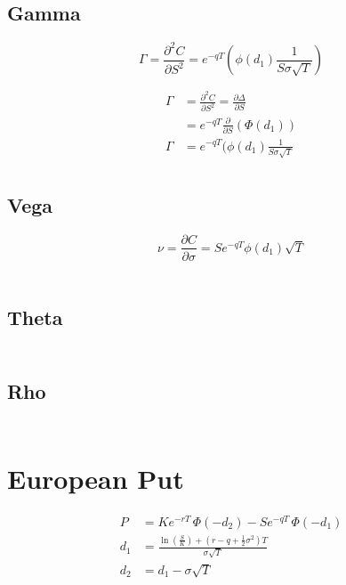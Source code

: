 \documentclass[12pt,a4paper]{article}
\begin{document}
\subsection{Gamma}

\[
  \boxed{\Gamma = \frac{\partial^2 C}{\partial S^2} = e^{-qT}(\phi(d_1)\frac{1}{S\sigma\sqrt{T}}) }
\]

\[
  \begin{aligned}
    \Gamma & = \frac{\partial^2 C}{\partial S^2} = \frac{\partial \Delta}{\partial S} \\
           & = e^{-qT}\frac{\partial}{\partial S}(\Phi(d_1)) \\
    \Gamma & = e^{-qT}(\phi(d_1)\frac{1}{S\sigma\sqrt{T}} \\
  \end{aligned}
\]

\subsection{Vega}

\[
\boxed{\nu = \frac{\partial C}{\partial \sigma} = Se^{-qT}\phi(d_1)\sqrt{T}}
\]


\[
  \begin{aligned}
  \end{aligned}
\]

\subsection{Theta}

\[
  \begin{aligned}
  \end{aligned}
\]

\subsection{Rho}

\[
  \begin{aligned}
  \end{aligned}
\]

\section{European Put}

\[
  \begin{aligned}
    P   & = K e^{-rT} \,\Phi(-d_2) - S e^{-qT} \,\Phi(-d_1)                       \\ d_1 & = \frac{\ln\!
    \left(\tfrac{S}{K}\right) + (r - q + \tfrac{1}{2}\sigma^2)T}{\sigma \sqrt{T}} \\
    d_2 & = d_1 - \sigma \sqrt{T}
  \end{aligned}
\]
\end{document}
